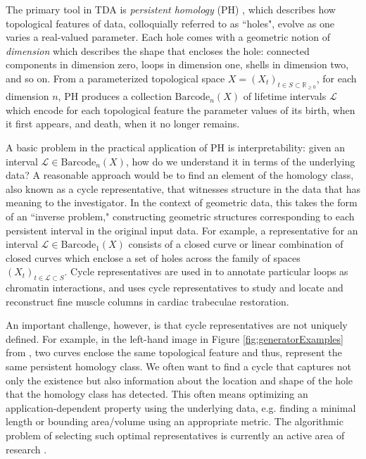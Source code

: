 \documentclass[utf8]{formatting_stuff/frontiersFPHY}
\newcommand{\R}{\mathbb{R}}
\newcommand{\fig}{Figure }
\newcommand{\barcode}{\mathrm{Barcode}}
\newcommand{\persinterval}{\mathcal{L}}
\theoremstyle{plain}
\theoremstyle{definition}
\begin{document}
The primary tool in TDA is \textit{persistent homology} (PH) \cite{Ghrist08}, which describes how topological features of data, colloquially referred to as ``holes", evolve as one varies a real-valued parameter. Each hole comes with a geometric notion of  \emph{dimension} which describes the shape that encloses the hole: connected components in dimension zero, loops in dimension one, shells in dimension two, and so on. From a parameterized topological space $X = (X_t)_{t \in S \subset \R_{\ge 0}}$, for each dimension $n$, PH produces a collection $\barcode_n(X)$ of lifetime intervals $\persinterval$ which encode for each topological feature the parameter values of its birth, when it first appears, and death, when it no longer remains.

A basic problem in the practical application of PH is interpretability: given an interval $\persinterval \in \barcode_n(X)$, how do we understand it in terms of the underlying data? A reasonable approach would be to find an element of the homology class, also known as a cycle representative, that  witnesses structure in the data that has meaning to the investigator. In the context of geometric data, this takes the form of an ``inverse problem,"  constructing  geometric structures corresponding to each persistent interval in the original input data.
For example, a representative for an interval $\persinterval \in \barcode_1(X)$ consists of a closed curve or linear combination of closed curves which enclose a set of holes across the family of spaces $(X_t)_{t \in \persinterval \subset S}$. Cycle representatives are used in \cite{emmett2015multiscale} to annotate particular loops as chromatin interactions, and  \cite{wu} uses cycle representatives to study and locate and reconstruct fine muscle columns in  cardiac trabeculae restoration.

An important challenge, however, is that cycle representatives are not uniquely defined. For example, in the left-hand image in \fig \ref{fig:generatorExamples} from \cite{Carlsson2009TopologyAD}, two curves enclose the same topological feature and thus, represent the same persistent homology class. We often want to find a cycle that captures not only the existence but also information about the location and shape of the hole that the homology class has detected. This often means optimizing an application-dependent property using the underlying data, e.g. finding a minimal length or bounding area/volume using an appropriate metric. The algorithmic problem of selecting such optimal representatives is currently an active area of research \cite{dey2011optimal,dey2018,Obayashi2018,wu,chen2010measuring}. 
\end{document}

